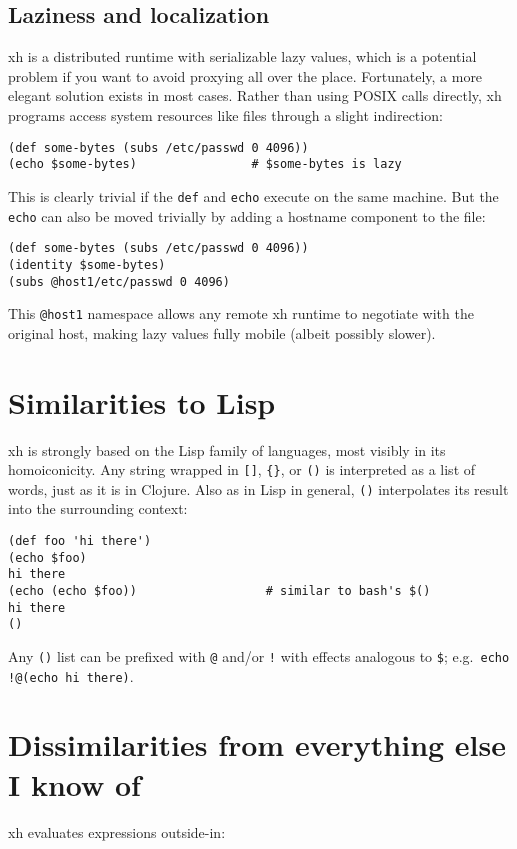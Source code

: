\documentclass{report}
\begin{document}
\section{Laziness and localization}\label{sec:laziness-and-localization}
    xh is a distributed runtime with serializable lazy values, which is a
    potential problem if you want to avoid proxying all over the place.
    Fortunately, a more elegant solution exists in most cases. Rather than
    using POSIX calls directly, xh programs access system resources like files
    through a slight indirection:

\begin{verbatim}
(def some-bytes (subs /etc/passwd 0 4096))
(echo $some-bytes)                # $some-bytes is lazy
\end{verbatim}

    This is clearly trivial if the {\tt def} and {\tt echo} execute on the same
    machine. But the {\tt echo} can also be moved trivially by adding a
    hostname component to the file:

\begin{verbatim}
(def some-bytes (subs /etc/passwd 0 4096))
(identity $some-bytes)
(subs @host1/etc/passwd 0 4096)
\end{verbatim}

    This {\tt @host1} namespace allows any remote xh runtime to negotiate with
    the original host, making lazy values fully mobile (albeit possibly
    slower).

\chapter{Similarities to Lisp}\label{chp:similarities-to-lisp}
  xh is strongly based on the Lisp family of languages, most visibly in its
  homoiconicity. Any string wrapped in \verb|[]|, \verb|{}|, or \verb|()| is
  interpreted as a list of words, just as it is in Clojure. Also as in Lisp in
  general, \verb|()| interpolates its result into the surrounding context:

\begin{verbatim}
(def foo 'hi there')
(echo $foo)
hi there
(echo (echo $foo))                  # similar to bash's $()
hi there
()
\end{verbatim}

  Any \verb|()| list can be prefixed with \verb|@| and/or \verb|!| with effects
  analogous to \verb|$|; e.g.~\verb|echo !@(echo hi there)|.

\chapter{Dissimilarities from everything else I know of}\label{chp:dissimilarities}
  xh evaluates expressions outside-in:
\end{document}
